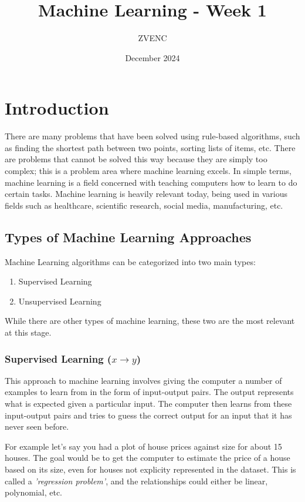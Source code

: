 \documentclass{article}
\title{Machine Learning - Week 1}
\author{ZVENC}
\date{December 2024}
\begin{document}
\maketitle

\section{Introduction}
There are many problems that have been solved using rule-based algorithms, such as finding the shortest path between two points, sorting lists of items, etc. There are problems that cannot be solved this way because they are simply too complex; this is a problem area where machine learning excels. In simple terms, machine learning is a field concerned with teaching computers how to learn to do certain tasks. Machine learning is heavily relevant today, being used in various fields such as healthcare, scientific research, social media, manufacturing, etc.

\subsection{Types of Machine Learning Approaches}
Machine Learning algorithms can be categorized into two main types:

\begin{enumerate}

\item Supervised Learning
\item Unsupervised Learning

\end{enumerate}

\noindent While there are other types of machine learning, these two are the most relevant at this stage.

\subsubsection{Supervised Learning ($x \rightarrow y$)}
This approach to machine learning involves giving the computer a number of examples to learn from in the form of input-output pairs. The output represents what is expected given a particular input. The computer then learns from these input-output pairs and tries to guess the correct output for an input that it has never seen before.

For example let's say you had a plot of house prices against size for about 15 houses. The goal would be to get the computer to estimate the price of a house based on its size, even for houses not explicity represented in the dataset. This is called a \textit{'regression problem'}, and the relationships could either be linear, polynomial, etc.
\end{document}
